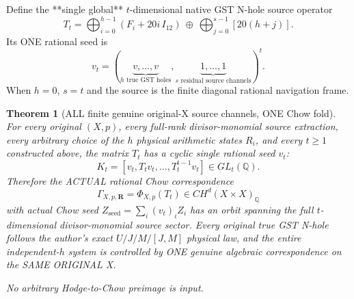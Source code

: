 \documentclass[11pt]{article}
\newtheorem{theorem}{Theorem}
\begin{document}
Define the **single global** $t$-dimensional
native GST N-hole source operator
\[
\boxed{
T_t=
\bigoplus_{i=0}^{h-1}
\left(F_i+20i\,I_{12}\right)
\ \oplus\
\bigoplus_{j=0}^{s-1}[20(h+j)] .
}
\]
Its ONE rational seed is
\[
v_t=(\underbrace{v,\ldots,v}_{h\text{ true GST holes}},
\underbrace{1,\ldots,1}_{s\text{ residual source channels}})^t.
\]
When $h=0$, $s=t$ and the source is the
finite diagonal rational navigation frame.

\begin{theorem}[ALL finite genuine original-X source channels, ONE Chow fold]
For every original $(X,p)$, every full-rank divisor-monomial
source extraction, every arbitrary choice of the $h$
physical arithmetic states $R_i$, and every $t\ge1$
constructed above, the matrix $T_t$ has a \emph{cyclic}
single rational seed $v_t$:
\[
\boxed{
K_t=[v_t,T_tv_t,\ldots,T_t^{t-1}v_t]
\in GL_t(\mathbb Q).
}
\]
Therefore the ACTUAL rational Chow correspondence
\[
\boxed{
\Gamma_{X,p,\mathbf R}=\Phi_{X,p}(T_t)
\in CH^d(X\times X)_{\mathbb Q}
}
\]
with actual Chow seed
$Z_{\mathrm{seed}}=\sum_i(v_t)_iZ_i$
has an orbit spanning the full $t$-dimensional
divisor-monomial source sector.
Every original true GST N-hole follows the
author's exact $U/J/M/[J,M]$ physical law,
and the entire independent-$h$ system
is controlled by ONE genuine algebraic
correspondence on the SAME ORIGINAL X.

No arbitrary Hodge-to-Chow preimage is input.
\end{theorem}
\end{document}
